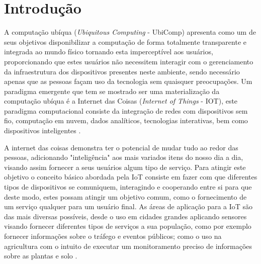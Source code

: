 \documentclass[ti,table]{texufpel} %
\begin{document}
\tableofcontents

\chapter{Introdução}

A computação ubíqua (\textit{Ubiquitous Computing} - UbiComp) apresenta como um de seus objetivos  disponibilizar a computação de forma totalmente transparente e integrada ao mundo físico tornando esta imperceptível aos usuários, proporcionando que estes usuários não necessitem interagir com o gerenciamento da infraestrutura dos dispositivos presentes neste ambiente, sendo necessário apenas que as pessoas façam uso da tecnologia sem quaisquer preocupações. Um paradigma emergente que tem se mostrado ser uma materialização da computação ubíqua é a Internet das Coisas (\textit{Internet of Things} - IOT), este paradigma computacional consiste da integração de redes com dispositivos sem fio, computação em nuvem, dados analíticos, tecnologias interativas, bem como dispositivos inteligentes \cite{weiser1999computer}. 

A internet das coisas demonstra ter o potencial de mudar tudo ao redor das pessoas, adicionando "inteligência" aos mais variados itens do nosso dia a dia, visando assim fornecer a seus usuários algum tipo de serviço. Para atingir este objetivo o conceito básico abordada pela IoT consiste em fazer com que diferentes tipos de dispositivos se comuniquem, interagindo e cooperando entre si para que deste modo, estes possam atingir um objetivo comum, como o fornecimento de um serviço qualquer para um usuário final. As áreas de aplicação para a IoT são das mais diversas possíveis, desde o uso em cidades grandes aplicando sensores visando fornecer diferentes tipos de serviços a sua população, como por exemplo fornecer informações sobre o tráfego e eventos públicos; como o uso na agricultura com o intuito de executar um monitoramento preciso de  informações sobre as plantas e solo \cite{gonccalves2017research}.
\end{document}
